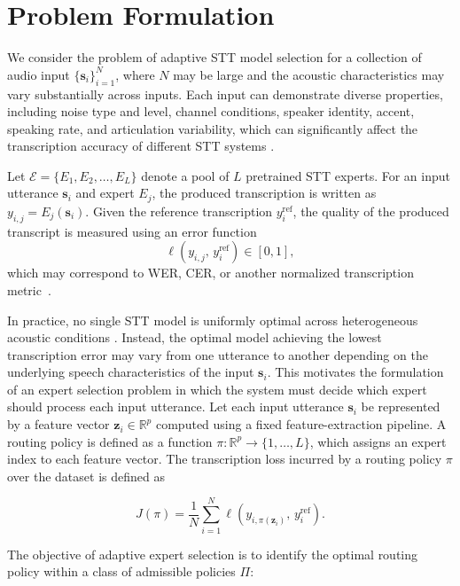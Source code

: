 \documentclass[journal]{IEEEtran}
\begin{document}
\section{Problem Formulation}
\label{sec:problem_formulation}

We consider the problem of adaptive STT model
selection for a collection of audio input
$\{\mathbf{s}_i\}_{i=1}^{N}$, where $N$ may be large and the acoustic characteristics may vary substantially
across inputs. Each input can demonstrate diverse properties, including noise type and level, channel conditions, speaker
identity, accent, speaking rate, and articulation variability, which can significantly affect the transcription accuracy of different STT systems \cite{yu2016asrdeep,li2014overviewrobust}.

Let $\mathcal{E} = \{E_1, E_2, \ldots, E_L\}$ denote a pool of $L$ pretrained STT experts. For an input utterance $\mathbf{s}_i$ and expert $E_j$, the produced transcription is written as $y_{i,j} = E_j(\mathbf{s}_i).$ Given the reference transcription $y_i^{\mathrm{ref}}$, the quality of
the produced transcript is measured using an error function
\[
\ell(y_{i,j},\,y_i^{\mathrm{ref}}) \in [0,1],
\]
which may correspond to WER, CER, or another normalized transcription metric~\cite{li2014overviewrobust}.

In practice, no single STT model is uniformly optimal across heterogeneous acoustic conditions
\cite{yu2016asrdeep,radford2022whisper,li2014overviewrobust}. Instead,
the optimal model achieving the lowest transcription error may vary from one utterance to another depending on
the underlying speech characteristics of the input $\mathbf{s}_i$. This motivates the formulation
of an expert selection problem in which the system must decide which
expert should process each input utterance. Let each input utterance $\mathbf{s}_i$ be represented
by a feature vector $\mathbf{z}_i \in \mathbb{R}^{p}$ computed using a fixed feature-extraction pipeline. A routing policy is defined as a function $\pi : \mathbb{R}^{p} \rightarrow \{1,\ldots,L\}$, which assigns an expert index to each feature vector. The transcription loss incurred by a routing policy $\pi$ over the dataset is defined as

\[
J(\pi)
=
\frac{1}{N}
\sum_{i=1}^{N}
\ell\!\left(y_{i,\pi(\mathbf{z}_i)},\,y_i^{\mathrm{ref}}\right).
\]

The objective of adaptive expert selection is to identify the optimal
routing policy within a class of admissible policies $\Pi$:
\end{document}
